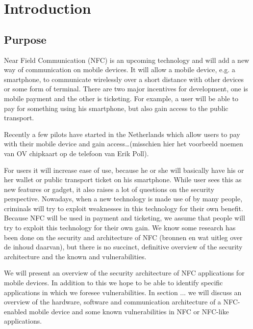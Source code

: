 \chapter*{Introduction}

\section*{Purpose}

Near Field Communication (NFC)  is an upcoming technology and will add a new way of communication on mobile devices.
It will allow a mobile device, e.g. a smartphone, to communicate wirelessly over a short distance with other devices or some form of terminal. There are two major incentives for development, one is mobile payment and the other is ticketing. For example, a user will be able to pay for something using his smartphone, but also gain access to the public transport. 

Recently a few pilots have started in the Netherlands which allow users to pay with their mobile device and gain access…(misschien hier het voorbeeld noemen van OV chipkaart op de telefoon van Erik Poll).
 
For users it will increase ease of use, because he or she will basically have his or her wallet or public transport ticket on his smartphone.
While user sees this as new features or gadget, it also raises a lot of questions on the security perspective. 
Nowadays, when a new technology is made use of by many people, criminals will try to exploit weaknesses in this technology for their own benefit.
Because NFC will be used in payment and ticketing, we assume that people will try to exploit this technology for their own gain. 
We know some research has been done on the security and architecture of NFC  (bronnen en wat uitleg over de inhoud daarvan), but there is no succinct, definitive overview of the security architecture and the known and vulnerabilities.

We will present an overview of the security architecture of NFC applications for mobile devices.
In addition to this we hope to be able to identify specific applications in which we foresee vulnerabilities.
In section ... we will discuss an overview of the hardware, software and communication architecture of a NFC-enabled mobile device and some known vulnerabilities in NFC or NFC-like applications.
 
